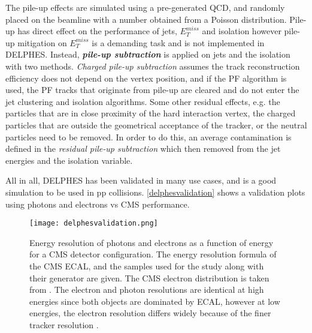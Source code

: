 {The pile-up effects are simulated using a pre-generated QCD, and randomly placed on the beamline with a number obtained from a Poisson distribution. Pile-up has direct effect on the performance of jets, $E_T^{miss}$ and isolation however pile-up mitigation on $E_T^{miss}$ is a demanding task and is not implemented in DELPHES. Instead, \emph{\bf{pile-up subtraction}} is applied on jets and the isolation with two methods. \emph{Charged pile-up subtraction} assumes the track reconstruction efficiency does not depend on the vertex position, and if the PF algorithm is used, the PF tracks that originate from pile-up are cleared and do not enter the jet clustering and isolation algorithms. Some other residual effects, e.g. the particles that are in close proximity of the hard interaction vertex, the charged particles that are outside the geometrical acceptance of the tracker, or the neutral particles need to be removed. In order to do this, an average contamination is defined in the \emph{residual pile-up subtraction} which then removed from the jet energies and the isolation variable.

All in all, DELPHES has been validated in many use cases, and is a good simulation to be used in pp collisions. \autoref{delphesvalidation} shows a validation plots using photons and electrons vs CMS performance.

\begin{figure}[ht]
	\centering
	\texttt{[image: delphesvalidation.png]}
	\vspace{2mm}
	\caption[Energy resolution of photons and electrons as a function of energy for a CMS detector configuration.  The energy resolution formula of the CMS ECAL, and the samples used for the study along with their generator are given. The CMS electron distribution is taken from . The electron and photon resolutions are identical at high energies since both objects are dominated by ECAL, however at low energies, the electron resolution differs widely because of the finer tracker resolution.]
	{Energy resolution of photons and electrons as a function of energy for a CMS detector configuration.  The energy resolution formula of the CMS ECAL, and the samples used for the study along with their generator are given. The CMS electron distribution is taken from \cite{CMS:2013hoa}. The electron and photon resolutions are identical at high energies since both objects are dominated by ECAL, however at low energies, the electron resolution differs widely because of the finer tracker resolution \cite{deFavereau2014}.}
	\label{delphesvalidation}
\end{figure}

}

